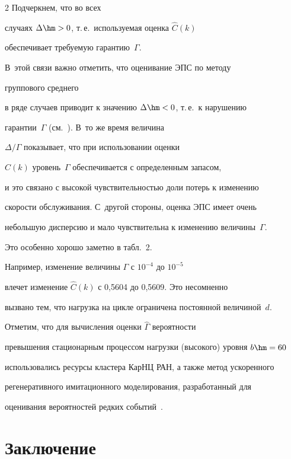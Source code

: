 \begin{multicols}{2}
 Подчеркнем, что во всех

случаях $\Delta \hm> 0$, т.\,е.\ используемая оценка $\hat{C}(k)$

обеспечивает требуемую гарантию~$\Gamma$.

 В~этой связи важно отметить, что оценивание ЭПС по методу

группового среднего 

в ряде случаев приводит к значению  $\Delta \hm< 0$, т.\,е.\  к нарушению

гарантии~$\Gamma$ (см.~\cite{KRC}). В~то же время величина

$\Delta/\Gamma$ показывает, что при использовании оценки

$\hat{C}(k)$ уровень~$\Gamma$ обеспечивается с определенным запасом,

и это  связано с высокой чувствительностью доли потерь к изменению

скорости обслуживания. С~другой стороны, оценка ЭПС имеет очень

небольшую дисперсию и мало  чувствительна к изменению величины~$\Gamma$.  

Это особенно  хорошо заметно в табл.~2.

Например, изменение величины $\Gamma$ с  $10^{-4}$ до $10^{-5}$

влечет изменение $\hat{C}(k)$ с 0,5604 до 0,5609. Это несомненно

вызвано  тем, что  нагрузка на цикле ограничена постоянной величиной~$d$.



Отметим, что для вычисления оценки $\hat\Gamma$ вероятности

превышения стационарным процессом нагрузки (высокого) уровня $b\hm=60$

использовались ресурсы кластера КарНЦ РАН, а также метод ускоренного

регенеративного имитационного моделирования, разработанный  для

оценивания вероятностей редких событий~\cite{PPM09}.



\vspace*{-4pt}



\section{Заключение}



\vspace*{-2pt}




\end{multicols}
